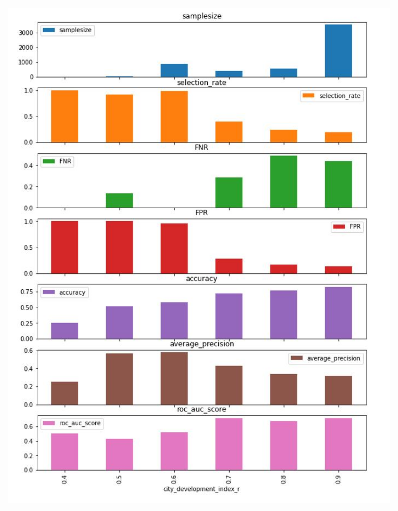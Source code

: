 \begin{figure}
    \centering
\includegraphics[width=0.9\textwidth,height=0.98\textwidth]{development.JPG}
    \label{fig: 2}
\end{figure}





